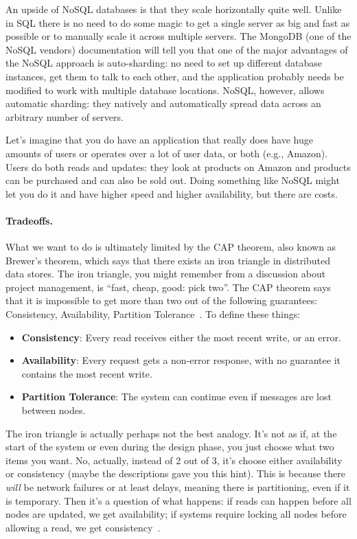 \documentclass[a4paper]{report}
\begin{document}
An upside of NoSQL databases is that they scale horizontally quite well. Unlike in SQL there is no need to do some magic to get a single server as big and fast as possible or to manually scale it across multiple servers. The MongoDB (one of the NoSQL vendors) documentation will tell you that one of the major advantages of the NoSQL approach is auto-sharding: no need to set up different database instances, get them to talk to each other, and the application probably needs be modified to work with multiple database locations. NoSQL, however, allows automatic sharding: they natively and automatically spread data across an arbitrary number of servers.  

Let's imagine that you do have an application that really does have huge amounts of users or operates over a lot of user data, or both (e.g., Amazon). Users do both reads and updates: they look at products on Amazon and products can be purchased and can also be sold out. Doing something like NoSQL might let you do it and have higher speed and higher availability, but there are costs. 

\paragraph{Tradeoffs.} What we want to do is ultimately limited by the CAP theorem, also known as Brewer's theorem, which says that there exists an iron triangle in distributed data stores. The iron triangle, you might remember from a discussion about project management, is ``fast, cheap, good: pick two''. The CAP theorem says that it is impossible to get more than two out of the following guarantees: Consistency, Availability, Partition Tolerance~\cite{brewercap}. To define these things:

\begin{itemize}
	\item \textbf{Consistency}: Every read receives either the most recent write, or an error.
	\item \textbf{Availability}: Every request gets a non-error response, with no guarantee it contains the most recent write.
	\item \textbf{Partition Tolerance}: The system can continue even if messages are lost between nodes.
\end{itemize}

The iron triangle is actually perhaps not the best analogy. It's not as if, at the start of the system or even during the design phase, you just choose what two items you want. No, actually, instead of 2 out of 3, it's choose either availability or consistency (maybe the descriptions gave you this hint). This is because there \textit{will} be network failures or at least delays, meaning there is partitioning, even if it is temporary. Then it's a question of what happens: if reads can happen before all nodes are updated, we get availability; if systems require locking all nodes before allowing a read, we get consistency~\cite{bettercap}.
\end{document}
